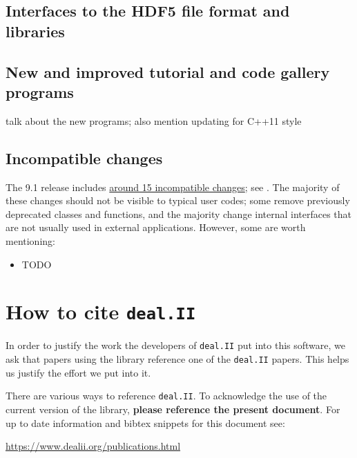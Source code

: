 \documentclass{ansarticle-preprint}
\newcommand{\specialword}[1]{\texttt{#1}}
\newcommand{\dealii}{{\specialword{deal.II}}\xspace}
\begin{document}
\subsection{Interfaces to the HDF5 file format and libraries}

\subsection{New and improved tutorial and code gallery programs}

talk about the new programs; also mention updating for C++11 style


\subsection{Incompatible changes}

The 9.1 release includes
\href{https://dealii.org/developer/doxygen/deal.II/changes_between_9_0_0_and_9_1_0.html}
     {around 15 incompatible changes}; see \cite{changes91}. The majority of these changes
should not be visible to typical user codes; some remove previously
deprecated classes and functions, and the majority change internal
interfaces that are not usually used in external
applications. However, some are worth mentioning:
\begin{itemize}
\item TODO
\end{itemize}



\section{How to cite \dealii}\label{sec:cite}

In order to justify the work the developers of \dealii put into this
software, we ask that papers using the library reference one of the
\dealii papers. This helps us justify the effort we put into it.

There are various ways to reference \dealii. To acknowledge the use of
the current version of the library, \textbf{please reference the present
document}. For up to date information and bibtex snippets for this document
see:
\begin{center}
 \url{https://www.dealii.org/publications.html}
\end{center}
\end{document}
